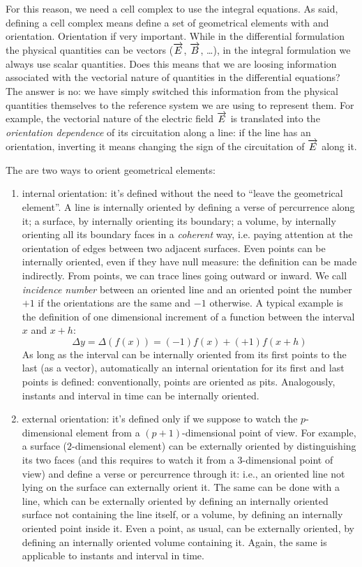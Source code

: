 
For this reason, we need a cell complex to use the integral
equations. As said, defining a cell complex means define a set of
geometrical elements with and orientation. Orientation if very
important. While in the differential formulation the physical
quantities can be vectors ($\overrightarrow{E}$, $\overrightarrow{B}$, \ldots), in the integral
formulation we always use scalar quantities. Does this means that we
are loosing information associated with the vectorial nature of
quantities in the differential equations? The answer is no: we have
simply switched this information from the physical quantities
themselves to the reference system we are using to represent them. For
example, the vectorial nature of the electric field $\overrightarrow{E}$ is translated
into the \emph{orientation dependence} of its circuitation along a
line: if the line has an orientation, inverting it means changing the
sign of the circuitation of $\overrightarrow{E}$ along it.

The are two ways to orient geometrical elements:
\begin{enumerate}
\item
  internal orientation: it's defined without the need to ``leave the
  geometrical element''. A line is internally oriented by defining a
  verse of percurrence along it; a surface, by internally orienting
  its boundary; a volume, by internally orienting all its boundary
  faces in a \emph{coherent} way, i.e. paying attention at the
  orientation of edges between two adjacent surfaces. Even points can
  be internally oriented, even if they have null
  measure: the definition can be made indirectly. From points, we
  can trace lines going outward or inward. We call \emph{incidence
  number} between an oriented line and an oriented point the number
  $+1$ if the orientations are the same and $-1$ otherwise. A typical
  example is the definition of one dimensional increment of a function
  between the interval $x$ and $x+h$:
  $$
  \Delta y = \Delta (f(x)) = (-1) f(x) + (+1) f(x+h)
  $$
  As long as the interval can be internally oriented from its first
  points to the last (as a vector), automatically an internal
  orientation for its first and last points is defined:
  conventionally, points are oriented as pits. Analogously, instants
  and interval in time can be internally oriented.
\item
  external orientation: it's defined only if we suppose to watch the
  $p$-dimensional element from a $(p+1)$-dimensional point of
  view. For example, a surface ($2$-dimensional element) can be
  externally oriented by distinguishing its two faces (and this
  requires to watch it from a $3$-dimensional point of view) and
  define a verse or percurrence through it: i.e., an oriented line not
  lying on the surface can externally orient it. The same can be done
  with a line, which can be externally oriented by defining an
  internally oriented surface not containing the line itself, or a
  volume, by defining an internally oriented point inside it. Even
  a point, as usual, can be externally oriented, by defining an
  internally oriented volume containing it. Again, the same is
  applicable to instants and interval in time.
\end{enumerate}

